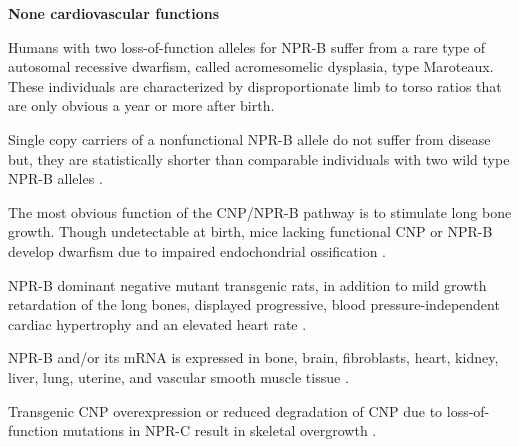 \documentclass[14pt,a4paper,onecolumn]{extarticle}
\begin{document}
\textbf{None cardiovascular functions}

Humans with two loss-of-function alleles for NPR-B suffer from a rare type of autosomal recessive dwarfism, called acromesomelic dysplasia, type Maroteaux. These individuals are characterized by disproportionate limb to torso ratios that are only obvious a year or more after birth. \citep{Bartels2004}

Single copy carriers of a nonfunctional NPR-B allele do not suffer from disease but, they are statistically shorter than comparable individuals with two wild type NPR-B alleles \citep{Olney2006}. %

The most obvious function of the CNP/NPR-B pathway is to stimulate long bone growth. Though undetectable at birth, mice lacking functional CNP or NPR-B develop dwarfism due to impaired endochondrial ossification \citep{Tsuji2005}. %

NPR-B dominant negative mutant transgenic rats, in addition to mild growth retardation of the long bones, displayed progressive, blood pressure-independent cardiac hypertrophy and an elevated heart rate \citep{Langenickel2006}. %

NPR-B and/or its mRNA is expressed in bone, brain, fibroblasts, heart, kidney, liver, lung, uterine, and vascular smooth muscle tissue \citep{Bryan2006} \citep{Dickey2007}. %

Transgenic CNP overexpression or reduced degradation of CNP due to loss-of-function mutations in NPR-C result in skeletal overgrowth \citep{Yasoda2004}. %


\end{document}
